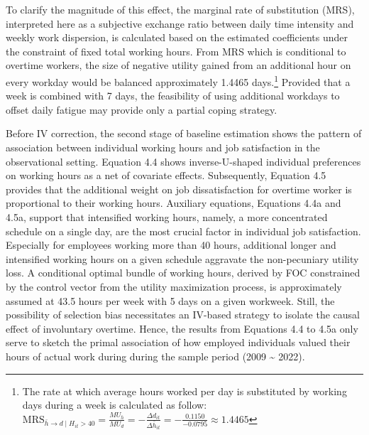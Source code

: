 \documentclass[
  12pt,
]{article}
\begin{document}
To clarify the magnitude of this effect, the marginal rate of
substitution (MRS), interpreted here as a subjective exchange ratio
between daily time intensity and weekly work dispersion, is calculated
based on the estimated coefficients under the constraint of fixed total
working hours. From MRS which is conditional to overtime workers, the
size of negative utility gained from an additional hour on every workday
would be balanced approximately 1.4465 days.\footnote{The rate at which
  average hours worked per day is substituted by working days during a
  week is calculated as follow:
  \(\text{MRS}_{{\bar{h} \rightarrow d} \mid H_{it} > 40} = \frac{MU_{\bar{h}}}{MU_d} = - \frac{\Delta d_{it}}{\Delta \bar{h}_{it}} = -\frac{0.1150}{-0.0795} \approx 1.4465\)}
Provided that a week is combined with 7 days, the feasibility of using
additional workdays to offset daily fatigue may provide only a partial
coping strategy.

Before IV correction, the second stage of baseline estimation shows the
pattern of association between individual working hours and job
satisfaction in the observational setting. Equation 4.4 shows
inverse-U-shaped individual preferences on working hours as a net of
covariate effects. Subsequently, Equation 4.5 provides that the
additional weight on job dissatisfaction for overtime worker is
proportional to their working hours. Auxiliary equations, Equations 4.4a
and 4.5a, support that intensified working hours, namely, a more
concentrated schedule on a single day, are the most crucial factor in
individual job satisfaction. Especially for employees working more than
40 hours, additional longer and intensified working hours on a given
schedule aggravate the non-pecuniary utility loss. A conditional optimal
bundle of working hours, derived by FOC constrained by the control
vector from the utility maximization process, is approximately assumed
at 43.5 hours per week with 5 days on a given workweek. Still, the
possibility of selection bias necessitates an IV-based strategy to
isolate the causal effect of involuntary overtime. Hence, the results
from Equations 4.4 to 4.5a only serve to sketch the primal association
of how employed individuals valued their hours of actual work during
during the sample period (2009 \textasciitilde{} 2022).
\end{document}
